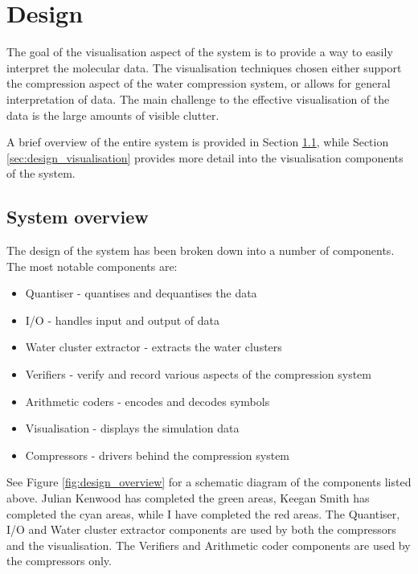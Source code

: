 \graphicspath{{./design/}}

\chapter{Design}
\label{cha:design}


The goal of the visualisation aspect of the system is to provide a way to
easily interpret the molecular data. The visualisation techniques chosen either
support the compression aspect of the water compression system, or allows for
general interpretation of data. The main challenge to the effective
visualisation of the data is the large amounts of visible clutter.

A brief overview of the entire system is provided in Section
\ref{sec:design_overview}, while Section \ref{sec:design_visualisation} provides
more detail into the visualisation components of the system.


\section{System overview}
\label{sec:design_overview}

The design of the system has been broken down into a number of components. The
most notable components are:

\begin{itemize}
  \item Quantiser - quantises and dequantises the data
  \item I/O - handles input and output of data
  \item Water cluster extractor - extracts the water clusters
  \item Verifiers - verify and record various aspects of the compression system
  \item Arithmetic coders - encodes and decodes symbols
  \item Visualisation - displays the simulation data
  \item Compressors - drivers behind the compression system
\end{itemize}

See Figure \ref{fig:design_overview} for a schematic diagram of the components
listed above. Julian Kenwood has completed the green areas, Keegan Smith has
completed the cyan areas, while I have completed the red areas. The Quantiser,
I/O and Water cluster extractor components are used by both the compressors and
the visualisation. The Verifiers and Arithmetic coder components are used by the
compressors only.

